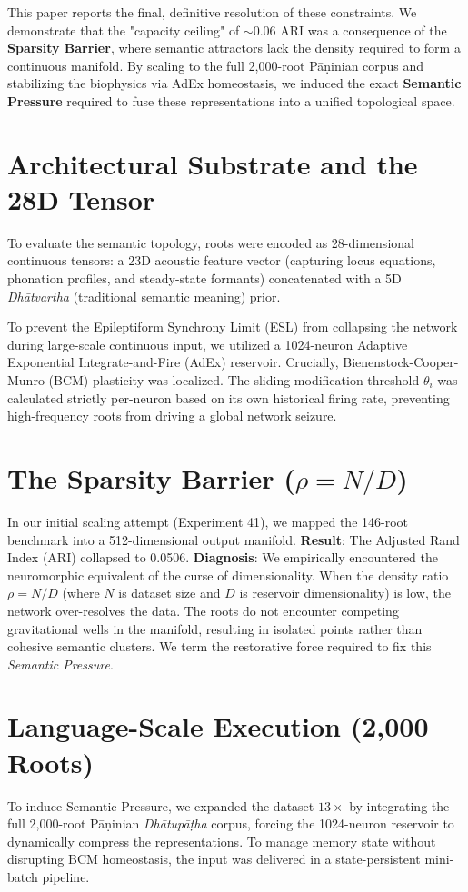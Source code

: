 \documentclass{article}
\begin{document}
This paper reports the final, definitive resolution of these constraints. We demonstrate that the "capacity ceiling" of $\sim$0.06 ARI was a consequence of the \textbf{Sparsity Barrier}, where semantic attractors lack the density required to form a continuous manifold. By scaling to the full 2,000-root Pāṇinian corpus and stabilizing the biophysics via AdEx homeostasis, we induced the exact \textbf{Semantic Pressure} required to fuse these representations into a unified topological space.

\section{Architectural Substrate and the 28D Tensor}
To evaluate the semantic topology, roots were encoded as 28-dimensional continuous tensors: a 23D acoustic feature vector (capturing locus equations, phonation profiles, and steady-state formants) concatenated with a 5D \textit{Dhātvartha} (traditional semantic meaning) prior. 

To prevent the Epileptiform Synchrony Limit (ESL) from collapsing the network during large-scale continuous input, we utilized a 1024-neuron Adaptive Exponential Integrate-and-Fire (AdEx) reservoir. Crucially, Bienenstock-Cooper-Munro (BCM) plasticity was localized. The sliding modification threshold $\theta_i$ was calculated strictly per-neuron based on its own historical firing rate, preventing high-frequency roots from driving a global network seizure.

\section{The Sparsity Barrier ($\rho = N/D$)}
In our initial scaling attempt (Experiment 41), we mapped the 146-root benchmark into a 512-dimensional output manifold. 
\textbf{Result}: The Adjusted Rand Index (ARI) collapsed to 0.0506.
\textbf{Diagnosis}: We empirically encountered the neuromorphic equivalent of the curse of dimensionality. When the density ratio $\rho = N/D$ (where $N$ is dataset size and $D$ is reservoir dimensionality) is low, the network over-resolves the data. The roots do not encounter competing gravitational wells in the manifold, resulting in isolated points rather than cohesive semantic clusters. We term the restorative force required to fix this \textit{Semantic Pressure}.

\section{Language-Scale Execution (2,000 Roots)}
To induce Semantic Pressure, we expanded the dataset $13\times$ by integrating the full 2,000-root Pāṇinian \textit{Dhātupāṭha} corpus, forcing the 1024-neuron reservoir to dynamically compress the representations. To manage memory state without disrupting BCM homeostasis, the input was delivered in a state-persistent mini-batch pipeline.
\end{document}
